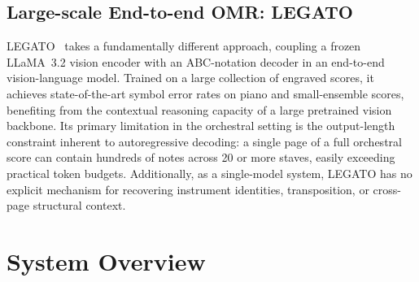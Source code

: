 \documentclass[11pt,a4paper]{article}
\begin{document}
\subsection{Large-scale End-to-end OMR: LEGATO}

LEGATO~\cite{legato} takes a fundamentally different approach, coupling a frozen LLaMA~3.2 vision encoder with an ABC-notation decoder in an end-to-end vision-language model.
Trained on a large collection of engraved scores, it achieves state-of-the-art symbol error rates on piano and small-ensemble scores, benefiting from the contextual reasoning capacity of a large pretrained vision backbone.
Its primary limitation in the orchestral setting is the output-length constraint inherent to autoregressive decoding: a single page of a full orchestral score can contain hundreds of notes across 20 or more staves, easily exceeding practical token budgets.
Additionally, as a single-model system, LEGATO has no explicit mechanism for recovering instrument identities, transposition, or cross-page structural context.

\section{System Overview}

\end{document}
